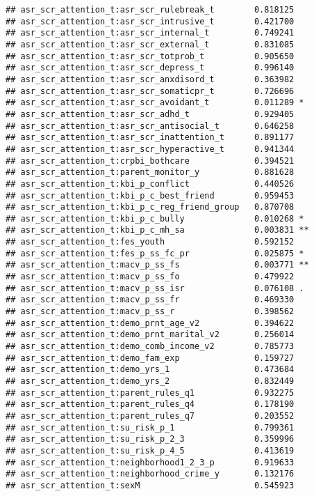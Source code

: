 \documentclass[
]{article}
\begin{document}
\begin{verbatim}
## asr_scr_attention_t:asr_scr_rulebreak_t        0.818125    
## asr_scr_attention_t:asr_scr_intrusive_t        0.421700    
## asr_scr_attention_t:asr_scr_internal_t         0.749241    
## asr_scr_attention_t:asr_scr_external_t         0.831085    
## asr_scr_attention_t:asr_scr_totprob_t          0.905650    
## asr_scr_attention_t:asr_scr_depress_t          0.996140    
## asr_scr_attention_t:asr_scr_anxdisord_t        0.363982    
## asr_scr_attention_t:asr_scr_somaticpr_t        0.726696    
## asr_scr_attention_t:asr_scr_avoidant_t         0.011289 *  
## asr_scr_attention_t:asr_scr_adhd_t             0.929405    
## asr_scr_attention_t:asr_scr_antisocial_t       0.646258    
## asr_scr_attention_t:asr_scr_inattention_t      0.891177    
## asr_scr_attention_t:asr_scr_hyperactive_t      0.941344    
## asr_scr_attention_t:crpbi_bothcare             0.394521    
## asr_scr_attention_t:parent_monitor_y           0.881628    
## asr_scr_attention_t:kbi_p_conflict             0.440526    
## asr_scr_attention_t:kbi_p_c_best_friend        0.959453    
## asr_scr_attention_t:kbi_p_c_reg_friend_group   0.870708    
## asr_scr_attention_t:kbi_p_c_bully              0.010268 *  
## asr_scr_attention_t:kbi_p_c_mh_sa              0.003831 ** 
## asr_scr_attention_t:fes_youth                  0.592152    
## asr_scr_attention_t:fes_p_ss_fc_pr             0.025875 *  
## asr_scr_attention_t:macv_p_ss_fs               0.003771 ** 
## asr_scr_attention_t:macv_p_ss_fo               0.479922    
## asr_scr_attention_t:macv_p_ss_isr              0.076108 .  
## asr_scr_attention_t:macv_p_ss_fr               0.469330    
## asr_scr_attention_t:macv_p_ss_r                0.398562    
## asr_scr_attention_t:demo_prnt_age_v2           0.394622    
## asr_scr_attention_t:demo_prnt_marital_v2       0.256014    
## asr_scr_attention_t:demo_comb_income_v2        0.785773    
## asr_scr_attention_t:demo_fam_exp               0.159727    
## asr_scr_attention_t:demo_yrs_1                 0.473684    
## asr_scr_attention_t:demo_yrs_2                 0.832449    
## asr_scr_attention_t:parent_rules_q1            0.932275    
## asr_scr_attention_t:parent_rules_q4            0.178190    
## asr_scr_attention_t:parent_rules_q7            0.203552    
## asr_scr_attention_t:su_risk_p_1                0.799361    
## asr_scr_attention_t:su_risk_p_2_3              0.359996    
## asr_scr_attention_t:su_risk_p_4_5              0.413619    
## asr_scr_attention_t:neighborhood1_2_3_p        0.919633    
## asr_scr_attention_t:neighborhood_crime_y       0.132176    
## asr_scr_attention_t:sexM                       0.545923    

\end{verbatim}
\end{document}
